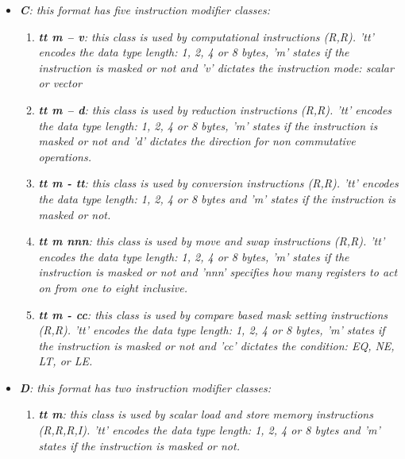 \begin{itemize}
\begin{enumerate}
                    \end{enumerate}

                \item \textit{\textbf{C}: this format has five instruction modifier classes:}

                    \begin{enumerate}

                        \item \textit{\textbf{tt m -- v}: this class is used by computational instructions (R,R). 'tt' encodes the data type length: 1, 2, 4 or 8 bytes, 'm' states if the instruction is masked or not and 'v' dictates the instruction mode: scalar or vector}

                        \item \textit{\textbf{tt m -- d}: this class is used by reduction instructions (R,R). 'tt' encodes the data type length: 1, 2, 4 or 8 bytes, 'm' states if the instruction is masked or not and 'd' dictates the direction for non commutative operations.}

                        \item \textit{\textbf{tt m - tt}: this class is used by conversion instructions (R,R). 'tt' encodes the data type length: 1, 2, 4 or 8 bytes and 'm' states if the instruction is masked or not.}

                        \item \textit{\textbf{tt m nnn}: this class is used by move and swap instructions (R,R). 'tt' encodes the data type length: 1, 2, 4 or 8 bytes, 'm' states if the instruction is masked or not and 'nnn' specifies how many registers to act on from one to eight inclusive.}

                        \item \textit{\textbf{tt m - cc}: this class is used by compare based mask setting instructions (R,R). 'tt' encodes the data type length: 1, 2, 4 or 8 bytes, 'm' states if the instruction is masked or not and 'cc' dictates the condition: EQ, NE, LT, or LE.}

                    \end{enumerate}

                \item \textit{\textbf{D}: this format has two instruction modifier classes:}

                    \begin{enumerate}

                        \item \textit{\textbf{tt m}: this class is used by scalar load and store memory instructions (R,R,R,I). 'tt' encodes the data type length: 1, 2, 4 or 8 bytes and 'm' states if the instruction is masked or not.}


\end{enumerate}
\end{itemize}
